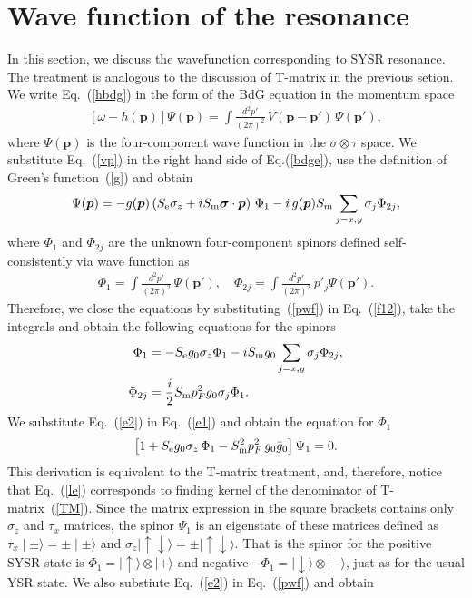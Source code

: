 \documentclass[twocolumn,showpacs,floatfix,nofootinbib,longbibliography]{revtex4-1}
\begin{document}
\section{Wave function of the resonance} \label{sec:wf}
In this section, we discuss the wavefunction corresponding to SYSR resonance. The treatment is analogous to the discussion of T-matrix in the previous setion. We write Eq.~(\ref{hbdg}) in the form of the BdG equation in the momentum space
\begin{align}
	\left[ \omega - h(\bm p) \right] \Psi(\bm p)= \int \frac{d^2 p'}{\left( 2\pi \right)^2}\,V(\bm p-\bm p')\,\Psi(\bm p'),	\label{bdge}
\end{align}
where $\Psi(\bm p)$ is the four-component wave function in the $\sigma\otimes\tau$ space. We substitute Eq.~(\ref{vp}) in the right hand side of Eq.(\ref{bdge}), use the definition of Green's function~(\ref{g}) and obtain 
\begin{align}
	\Psi (\bm p) = - g(\bm p) \left( S_{\rm e}\sigma_z +  i S_{\rm m}  \bm \sigma\cdot \bm  p \right)\,\Phi_1 -i\,g(\bm p)S_m\sum\limits_{j=x,y}\sigma_j \Phi_{2j},
	\label{pwf}
\end{align}
where $\Phi_1$ and $\Phi_{2j}$ are the unknown four-component spinors defined self-consistently via wave function as 
\begin{align}
	\Phi_1 =  \int \frac{d^2 p'}{\left( 2\pi \right)^2}\, \Psi(\bm p'),\quad \Phi_{2j} =  \int \frac{d^2 p'}{\left( 2\pi \right)^2}\, p'_j\Psi(\bm p').
	\label{f12}
\end{align}
Therefore, we close the equations by substituting~(\ref{pwf}) in Eq.~(\ref{f12}), take the integrals and obtain the following equations for the spinors
\begin{align}
	\Phi_1 &= -S_{\rm e} g_0 \sigma_z\Phi_1 - i S_{\rm m} g_{0} \sum_{j=x,y}\sigma_{j} \Phi_{2j}, \label{e1} \\
	\Phi_{2j} &= \frac{i}{2}S_{\rm m}p_{F}^2 g_0 \sigma_j \Phi_1. \label{e2}
\end{align}
We substitute Eq.~(\ref{e2}) in Eq.~(\ref{e1}) and obtain the equation for $\Phi_1$
\begin{align}
	\left[1+S_{\rm e} g_0 \sigma_z\,\Phi_1 -  S^2_{\rm m} p_F^2\,g_{0} \bar g_{0} \right] \Psi_1 = 0. \label{le} 
\end{align}
This derivation is equivalent to the T-matrix treatment, and, therefore, notice that Eq.~(\ref{le}) corresponds to finding kernel of the denominator of T-matrix~(\ref{TM}). Since the matrix expression in the square brackets contains only $\sigma_z$ and $\tau_x$ matrices, the spinor $\Psi_1$  is an eigenstate of these matrices defined as ${\tau_x \mid \pm\rangle = \pm \mid \pm\rangle}$ and ${\sigma_z \mid \uparrow\downarrow\rangle = \pm \mid\uparrow\downarrow\rangle}$. That is the spinor for the positive SYSR state is ${\Phi_{1} = \mid \uparrow\rangle\otimes \mid + \rangle}$ and negative - ${\Phi_{1} = \mid \downarrow\rangle\otimes \mid - \rangle}$, just as for the usual YSR state. We also substiute Eq.~(\ref{e2}) in Eq.~(\ref{pwf}) and obtain
\end{document}
